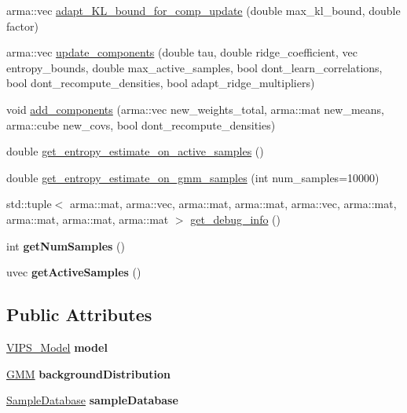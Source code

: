 \begin{DoxyCompactItemize}
arma\+::vec \hyperlink{classVIPS_aac85e9be0da81e9fa603528aa7958a0a}{adapt\+\_\+\+K\+L\+\_\+bound\+\_\+for\+\_\+comp\+\_\+update} (double max\+\_\+kl\+\_\+bound, double factor)
\item 
arma\+::vec \hyperlink{classVIPS_ae875912a0c60ac979909713aaffbc5e9}{update\+\_\+components} (double tau, double ridge\+\_\+coefficient, vec entropy\+\_\+bounds, double max\+\_\+active\+\_\+samples, bool dont\+\_\+learn\+\_\+correlations, bool dont\+\_\+recompute\+\_\+densities, bool adapt\+\_\+ridge\+\_\+multipliers)
\item 
void \hyperlink{classVIPS_a1b5eb59ab8fa1f16bc3db2a40b25f9a4}{add\+\_\+components} (arma\+::vec new\+\_\+weights\+\_\+total, arma\+::mat new\+\_\+means, arma\+::cube new\+\_\+covs, bool dont\+\_\+recompute\+\_\+densities)
\item 
double \hyperlink{classVIPS_acfc4f6911881e21b1b06276f7514bcfa}{get\+\_\+entropy\+\_\+estimate\+\_\+on\+\_\+active\+\_\+samples} ()
\item 
double \hyperlink{classVIPS_aeec7ba6219e433ad9ab6214e4ed0dd4a}{get\+\_\+entropy\+\_\+estimate\+\_\+on\+\_\+gmm\+\_\+samples} (int num\+\_\+samples=10000)
\item 
std\+::tuple$<$ arma\+::mat, arma\+::vec, arma\+::mat, arma\+::mat, arma\+::vec, arma\+::mat, arma\+::mat, arma\+::mat, arma\+::mat $>$ \hyperlink{classVIPS_ac824a4180e5a8475eeb5a7c68a6483b6}{get\+\_\+debug\+\_\+info} ()
\item 
int {\bfseries get\+Num\+Samples} ()\hypertarget{classVIPS_a9c3c1617a3e8be6b02a7b5166711bb46}{}\label{classVIPS_a9c3c1617a3e8be6b02a7b5166711bb46}

\item 
uvec {\bfseries get\+Active\+Samples} ()\hypertarget{classVIPS_abbaf88e98c600f465ae2799946305dab}{}\label{classVIPS_abbaf88e98c600f465ae2799946305dab}

\end{DoxyCompactItemize}
\subsection*{Public Attributes}
\begin{DoxyCompactItemize}
\item 
\hyperlink{classVIPS__Model}{V\+I\+P\+S\+\_\+\+Model} {\bfseries model}\hypertarget{classVIPS_a9929f2b77be4949c57ac9008d5f3ec5c}{}\label{classVIPS_a9929f2b77be4949c57ac9008d5f3ec5c}

\item 
\hyperlink{classGMM}{G\+MM} {\bfseries background\+Distribution}\hypertarget{classVIPS_a9e9d133d270287a47e693ebda4199a91}{}\label{classVIPS_a9e9d133d270287a47e693ebda4199a91}

\item 
\hyperlink{classSampleDatabase}{Sample\+Database} {\bfseries sample\+Database}\hypertarget{classVIPS_a29ce35cb0e4ba5bbff626bcccd88417b}{}\label{classVIPS_a29ce35cb0e4ba5bbff626bcccd88417b}

\end{DoxyCompactItemize}

